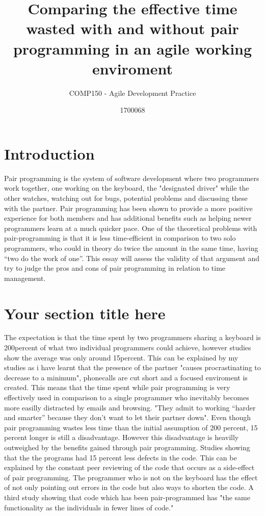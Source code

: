 \documentclass{scrartcl}
\title{Comparing the effective time wasted with and without pair programming in an agile working enviroment}
\subtitle{COMP150 - Agile Development Practice}
\author{1700068}
\begin{document}
\maketitle


\section{Introduction}

Pair programming is the system of software development where two programmers work together, one working on the keyboard, the "designated driver" while the other watches, watching out for bugs, potential problems and discussing these with the partner. Pair programming has been shown to provide a more positive experience for both members and has additional benefits such as helping newer programmers learn at a much quicker pace. One of the theoretical problems with pair-programming is that it is less time-efficient in comparison to two solo programmers, who could in theory do twice the amount in the same time, having “two do the work of one”. This essay will assess the validity of that argument and try to judge the pros and cons of pair programming in relation to time management.


\section{Your section title here}

The expectation is that the time spent by two programmers sharing a keyboard is 200percent of what two individual programmers could achieve, however studies show the average was only around 15percent. This can be explained by my studies as i have learnt that the presence of the partner "causes procrastinating to decrease to a minimum", phonecalls are cut short and a focused enviroment is created. This means that the time spent while pair programming is very effectively used in comparison to a single programmer who inevitably becomes more easilly distracted by emails and browsing. "They admit to working “harder and smarter” because they don’t want to let their partner down". 
Even though pair programming wastes less time than the initial assumption of 200 percent, 15 percent longer is still a disadvantage. However this disadvantage is heavilly outweighed by the benefits gained through pair programming. Studies showing that the the programs had 15 percent less defects in the code. This can be explained by the constant peer reviewing of the code that occurs as a side-effect of pair programming. The programmer who is not on the keyboard has the effect of not only pointing out errors in the code but also ways to shorten the code. A third study showing that code which has been pair-programmed has "the same functionality as the individuals in fewer lines of code."
\end{document}

